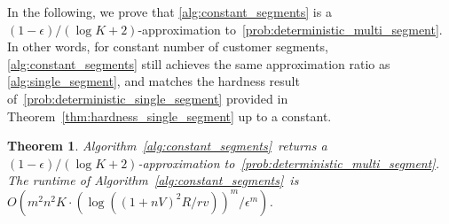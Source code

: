 \documentclass[msom,non-blindrev]{informs3} %
\newtheorem{theorem}{Theorem}
\theoremstyle{definition}
\begin{document}
In the following, we prove that \cref{alg:constant_segments} is a $(1-\epsilon)/(\log K+2)$-approximation to~\eqref{prob:deterministic_multi_segment}. In other words, for constant number of customer segments, \cref{alg:constant_segments} still achieves the same approximation ratio as \cref{alg:single_segment}, and matches the hardness result of~\eqref{prob:deterministic_single_segment} provided in Theorem~\ref{thm:hardness_single_segment} up to a constant.

\begin{theorem} \label{thm:multi-segement-constant-m}
Algorithm~\ref{alg:constant_segments}~returns a $(1-\epsilon)/(\log K+2)$-approximation to~\eqref{prob:deterministic_multi_segment}. The runtime of Algorithm~\ref{alg:constant_segments}~is $O(m^2n^2K\cdot(\log((1+nV)^2R/rv))^m/\epsilon^m)$.
\end{theorem}
\end{document}
